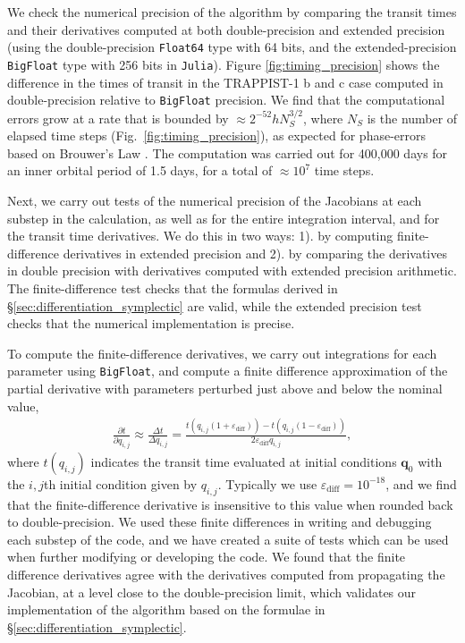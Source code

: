 \documentclass[fleqn,usenatbib,twocolumn]{mnras}
\begin{document}
We check the numerical precision of the algorithm by comparing the transit times and their derivatives computed at both double-precision and extended precision (using the double-precision \texttt{Float64} type with 64 bits, and the extended-precision \texttt{BigFloat} type with 256 bits in \texttt{Julia}).  Figure \ref{fig:timing_precision} shows the difference in the  times of transit
in the TRAPPIST-1 b and c case computed in double-precision relative to \texttt{BigFloat} precision.   We find that the computational errors grow at a rate that is bounded by $\approx 2^{-52}hN_S^{3/2}$, where $N_S$ is the number of elapsed time steps
(Fig.\ \ref{fig:timing_precision}), as expected for phase-errors based on Brouwer's Law \citep{Brouwer1937}.  The computation was carried out for 400,000 days for an inner orbital period of 1.5 days, for a total of $\approx 10^7$ time steps.

Next, we carry out tests of the numerical precision of the Jacobians
at each substep in the calculation, as well as for the entire integration
interval, and for the transit time derivatives.  We do this in two ways:  1). by computing finite-difference derivatives in extended precision and 2). by comparing the derivatives in double precision with derivatives computed with extended precision arithmetic.  The finite-difference test checks that the formulas derived in \S \ref{sec:differentiation_symplectic} are valid, while the extended precision test checks that the numerical implementation is precise.

To compute the finite-difference
derivatives, we carry out integrations for each parameter using \texttt{BigFloat},
and compute a finite difference approximation of the partial derivative with parameters perturbed just above and below the nominal
value,
\begin{eqnarray}\label{eqn:finite_diff}
    \frac{\partial t}{\partial q_{i,j}} \approx \frac{\Delta t}{\Delta q_{i,j}} = \frac{t(q_{i,j} (1+\varepsilon_\mathrm{diff})) - t(q_{i,j}(1-\varepsilon_\mathrm{diff}))}{2\varepsilon_\mathrm{diff} q_{i,j}},
\end{eqnarray}
where $t(q_{i,j})$ indicates the transit time evaluated at initial conditions $\mathbf{q}_0$ with the $i,j$th initial condition given by $q_{i,j}$.
Typically we use $\varepsilon_\mathrm{diff} = 10^{-18}$, and we find that the finite-difference derivative is insensitive to this value when rounded back to double-precision.
We used these finite differences in writing and debugging each
substep of the code, and we have created a suite of tests which can be used when
further modifying or developing the code.  We found that the finite difference derivatives agree with the derivatives computed from propagating the Jacobian, at a level close to the double-precision limit, which validates our implementation of the algorithm based on the formulae in \S \ref{sec:differentiation_symplectic}.
\end{document}
